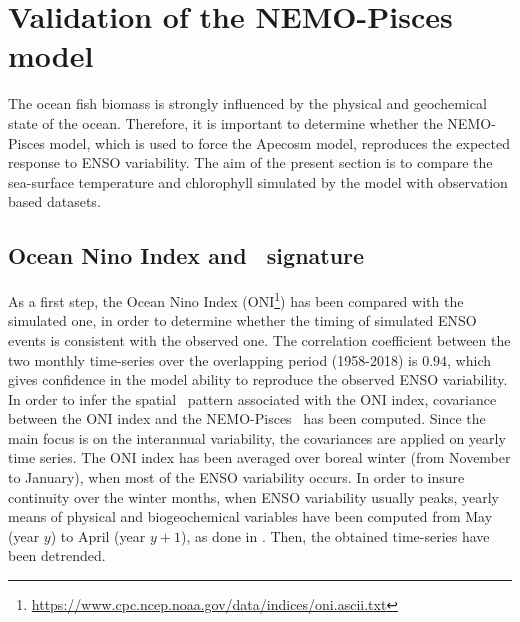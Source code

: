 \section{Validation of the NEMO-Pisces model}
\label{sec:pisces}

The ocean fish biomass is strongly influenced by the physical and geochemical state of the ocean. 
Therefore, it is important to determine whether the NEMO-Pisces model, which is used to force the Apecosm model, reproduces the expected response to ENSO variability.
The aim of the present section is to compare the sea-surface temperature and chlorophyll simulated by the model with observation based datasets.\\

\subsection{Ocean Nino Index and \sst\ signature}
\label{sec:sst}

As a first step, the Ocean Nino Index (ONI\footnote{\url{https://www.cpc.ncep.noaa.gov/data/indices/oni.ascii.txt}}) has been compared with the simulated one, in order to determine whether the timing of simulated ENSO events is consistent with the observed one. The correlation coefficient between the two monthly time-series over the overlapping period (1958-2018) is $0.94$, which gives confidence in the model ability to reproduce the observed ENSO variability. \\

In order to infer the spatial \sst\ pattern associated with the ONI index, covariance between the ONI index and the NEMO-Pisces \sst\ has been computed. Since the main focus is on the interannual variability, the covariances are applied on yearly time series. The ONI index has been averaged over boreal winter (from November to January), when most of the ENSO variability occurs. In order to insure continuity over the winter months, when ENSO variability usually peaks, yearly means of physical and biogeochemical variables have been computed from May (year $y$) to April (year $y + 1$), as done in \cite{racaultImpactNinoVariability2017}. Then, the obtained time-series have been detrended.\\


